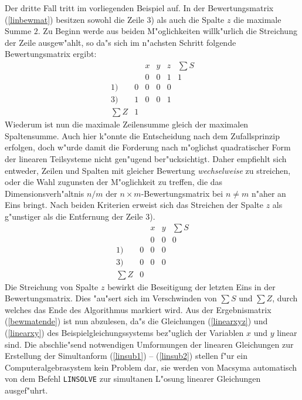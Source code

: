 Der dritte Fall tritt im vorliegenden Beispiel auf. In der 
Bewertungsmatrix (\ref{linbewmat}) besitzen sowohl die Zeile 3) als auch 
die Spalte $z$ die maximale Summe $2$. Zu Beginn werde aus beiden 
M"oglichkeiten willk"urlich die Streichung der Zeile ausgew"ahlt, so da"s 
sich im n"achsten Schritt folgende Bewertungsmatrix ergibt:
\begin{equation}
\begin{array}{rr|rrr|c}
       &   & x & y & z & \sum S\\
       &   & 0 & 0 & 1 &    1  \\
\hline
  1)   & 0 & 0 & 0 & 0 &       \\
  3)   & 1 & 0 & 0 & 1 &       \\
\hline
\sum Z & 1 &   &   &   &
\end{array}
\end{equation}
Wiederum ist nun die maximale Zeilensumme gleich der maximalen 
Spaltensumme. Auch hier k"onnte die Entscheidung nach dem Zufallsprinzip 
erfolgen, doch w"urde damit die Forderung nach m"oglichst quadratischer 
Form der linearen Teilsysteme nicht gen"ugend ber"ucksichtigt. Daher 
empfiehlt sich entweder, Zeilen und Spalten mit gleicher Bewertung
{\em wechselweise} zu streichen, oder die Wahl zugunsten der 
M"oglichkeit zu treffen, die das Dimensionsverh"altnis $n/m$ der $n 
\times m$-Bewertungsmatrix bei $n \neq m$ n"aher an Eins bringt. Nach 
beiden Kriterien erweist sich das Streichen der Spalte $z$ als 
g"unstiger als die Entfernung der Zeile 3).
\begin{equation} \label{bewmatende}
\begin{array}{rr|rr|c}
       &   & x & y & \sum S \\
       &   & 0 & 0 &    0   \\
\hline
  1)   & 0 & 0 & 0 &        \\
  3)   & 0 & 0 & 0 &        \\
\hline
\sum Z & 0 &   &   & 
\end{array}
\end{equation}
Die Streichung von Spalte $z$ bewirkt die Beseitigung der letzten Eins 
in der Bewertungsmatrix. Dies "au"sert sich im Verschwinden von $\sum S$
und $\sum Z$, durch welches das Ende des Algorithmus markiert wird. Aus
der Ergebnismatrix (\ref{bewmatende}) ist nun abzulesen, da"s die 
Gleichungen (\ref{linearxyz}) und (\ref{linearxy}) des 
Beispielgleichungssystems bez"uglich der Variablen $x$ und $y$ linear 
sind. Die ab\-schlie"send notwendigen Umformungen der linearen Gleichungen
zur Erstellung der Simultanform (\ref{linsub1}) -- (\ref{linsub2})
stellen f"ur ein Computeralgebrasystem kein Problem dar, sie werden von 
Macsyma automatisch von dem Befehl \verb+LINSOLVE+ zur simultanen L"osung 
linearer Gleichungen ausgef"uhrt.

